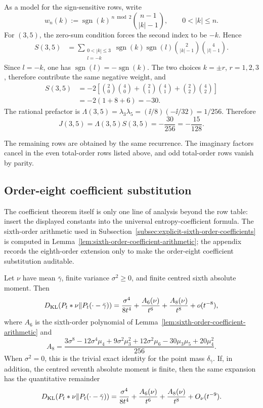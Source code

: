 As a model for the sign-sensitive rows, write
\[
w_n(k):=\operatorname{sgn}(k)^{\,n\bmod 2}
\binom{n-1}{|k|-1},\qquad 0<|k|\le n .
\]
For \((3,5)\), the zero-sum condition forces the second index to be \(-k\).
Hence
\[
\begin{aligned}
S(3,5)
&=\sum_{\substack{0<|k|\le3\\ l=-k}}
\operatorname{sgn}(k)\operatorname{sgn}(l)
\binom{2}{|k|-1}\binom{4}{|l|-1}.
\end{aligned}
\]
Since \(l=-k\), one has
\(\operatorname{sgn}(l)=-\operatorname{sgn}(k)\).  The two choices
\(k=\pm r\), \(r=1,2,3\), therefore contribute the same negative weight, and
\[
\begin{aligned}
S(3,5)
&=-2\left[
\binom20\binom40+\binom21\binom41+\binom22\binom42
\right]  \\
&=-2(1+8+6)=-30.
\end{aligned}
\]
The rational prefactor is
\(\Lambda(3,5)=\lambda_3\lambda_5=(\ii/8)(-\ii/32)=1/256\).  Therefore
\[
J(3,5)=\Lambda(3,5)S(3,5)=-\frac{30}{256}
=-\frac{15}{128}.
\]

The remaining rows are obtained by the same recurrence.  The imaginary
factors cancel in the even total-order rows listed above, and odd total-order
rows vanish by parity.

\subsection*{Order-eight coefficient substitution}
\label{subsec:appendix-optional-order-eight-layer}

The coefficient theorem itself is only one line of analysis beyond the row
table: insert the displayed constants into the universal entropy-coefficient
formula.  The sixth-order arithmetic used in
Subsection~\ref{subsec:explicit-sixth-order-coefficients} is computed in
Lemma~\ref{lem:sixth-order-coefficient-arithmetic}; the appendix records the
eighth-order extension only to make the order-eight coefficient substitution
auditable.

\begin{proposition}%
\label{lem:eighth-order-coefficient-arithmetic}
\label{lem:n4-entropy-coefficient-substitution}
\label{thm:poisson-kl-eighth}
\label{thm:poisson-kl-eighth-seventh-remainder}
Let \(\nu\) have mean \(\bar{\gamma}\), finite variance
\(\sigma^2\ge0\), and finite centred sixth absolute moment.  Then
\[
D_{\rm KL}(P_t*\nu\|P_t(\cdot-\bar{\gamma}))
=\frac{\sigma^4}{8t^4}+\frac{A_6(\nu)}{t^6}
+\frac{A_8(\nu)}{t^8}+o(t^{-8}),
\]
where \(A_6\) is the sixth-order polynomial of
Lemma~\ref{lem:sixth-order-coefficient-arithmetic} and
\[
A_8=
\frac{3\sigma^8-12\sigma^4\mu_4+9\sigma^2\mu_3^2
+12\sigma^2\mu_6-30\mu_3\mu_5+20\mu_4^2}{256}.
\]
When \(\sigma^2=0\), this is the trivial exact identity for the point mass
\(\delta_{\bar{\gamma}}\).  If, in addition, the centred seventh absolute
moment is finite, then the same expansion has the quantitative remainder
\[
D_{\rm KL}(P_t*\nu\|P_t(\cdot-\bar{\gamma}))
=\frac{\sigma^4}{8t^4}+\frac{A_6(\nu)}{t^6}
+\frac{A_8(\nu)}{t^8}+O_\nu(t^{-9}).
\]
\end{proposition}

